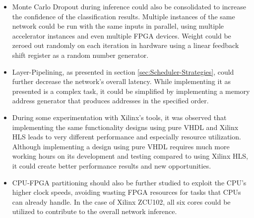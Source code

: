 \begin{itemize}
	\item Monte Carlo Dropout during inference could also be consolidated to increase the confidence of the classification results. Multiple instances of the same network could be run with the same inputs in parallel, using multiple accelerator instances and even multiple FPGA devices. Weight could be zeroed out randomly on each iteration in hardware using a linear feedback shift register as a random number generator.
	\item Layer-Pipelining, as presented in section \ref{sec:Scheduler-Strategies}, could further decrease the network's overall latency. While implementing it as presented is a complex task, it could be simplified by implementing a memory address generator that produces addresses in the specified order.
	\item During some experimentation with Xilinx's tools, it was observed that implementing the same functionality designs using pure VHDL and Xilinx HLS leads to very different performance and especially resource utilization. Although implementing a design using pure VHDL requires much more working hours on its development and testing compared to using Xilinx HLS, it could create better performance results and new opportunities.
	\item CPU-FPGA partitioning should also be further studied to exploit the CPU's higher clock speeds, avoiding wasting FPGA resources for tasks that CPUs can already handle. In the case of Xilinx ZCU102, all six cores could be utilized to contribute to the overall network inference.
\end{itemize}
